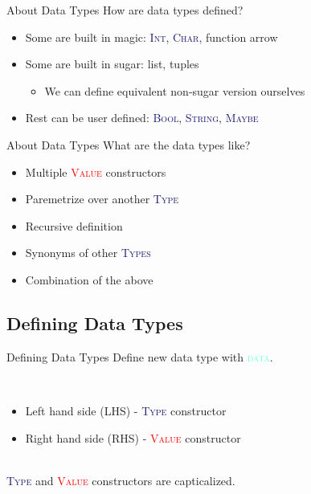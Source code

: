 \documentclass[xcolor={usenames,dvipsnames}]{beamer}
\newcommand{\hkeyword}[1]{\textcolor{Aquamarine}{\textsc{#1}}}
\newcommand{\htycon}[1]{\textcolor{MidnightBlue}{\textsc{#1}}}
\newcommand{\hvalcon}[1]{\textcolor{Red}{\textsc{#1}}}
\begin{document}
\begin{frame}[fragile]{About Data Types}
  How are data types defined?\\
  \begin{itemize}
    \item Some are built in magic: \htycon{Int}, \htycon{Char}, function arrow
    \item Some are built in sugar: list, tuples
      \begin{itemize}
        \item We can define equivalent non-sugar version ourselves
      \end{itemize}
    \item Rest can be user defined: \htycon{Bool}, \htycon{String}, \htycon{Maybe}
  \end{itemize}
\end{frame}

\begin{frame}[fragile]{About Data Types}
  What are the data types like?
  \begin{itemize}
    \item Multiple \hvalcon{Value} constructors
    \item Paremetrize over another \htycon{Type}
    \item Recursive definition
    \item Synonyms of other \htycon{Types}
    \item Combination of the above
  \end{itemize}
\end{frame}

\subsection{Defining Data Types}
\begin{frame}[fragile]{Defining Data Types}
  Define new data type with \hkeyword{data}.

  \ \\
  \begin{itemize}
    \item Left hand side (LHS) - \htycon{Type} constructor
    \item Right hand side (RHS) - \hvalcon{Value} constructor
  \end{itemize}

  \ \\
  \htycon{Type} and \hvalcon{Value} constructors are capticalized.
\end{frame}
\end{document}
